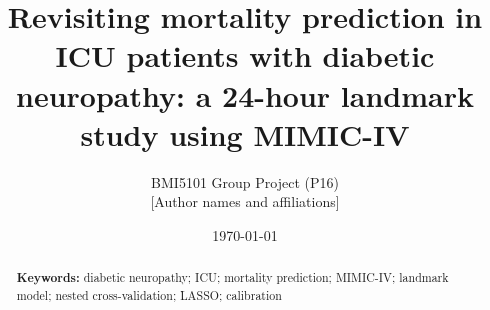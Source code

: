 \documentclass[11pt,a4paper]{article}
\title{Revisiting mortality prediction in ICU patients with diabetic neuropathy: a 24-hour landmark study using MIMIC-IV}
\author{BMI5101 Group Project (P16)\\[2pt] \small [Author names and affiliations]}
\date{\today}
\begin{document}
\maketitle

\begin{abstract}
\noindent


\smallskip\noindent\textbf{Keywords:} diabetic neuropathy; ICU; mortality prediction; MIMIC-IV; landmark model; nested cross-validation; LASSO; calibration
\end{abstract}



\printbibliography

\clearpage

\end{document}
